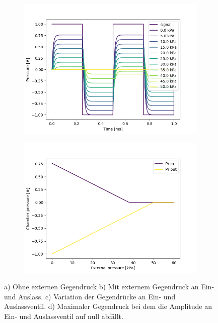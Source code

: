 \documentclass[fontsize=12pt, a4paper]{scrartcl}
\begin{document}
\begin{figure}[H]
\begin{subfigure}[H]{0.48\textwidth}
        \includegraphics[width=\textwidth, valign=t]{bilder/backpressure/backpressure_at_pr_in_and_pr_out.png}
    \end{subfigure}
    \begin{subfigure}[H]{0.48\textwidth}
        \includegraphics[width=\textwidth, valign=t]{bilder/backpressure/backpressure_result.png}
    \end{subfigure}
    \caption{a) Ohne externen Gegendruck b) Mit externem Gegendruck an Ein- und Auslass. c) Variation der Gegendrücke an Ein- und Auslassventil. d) Maximaler Gegendruck bei dem die Amplitude an Ein- und Auslassventil auf null abfällt.}
    \label{fig:gegendruck_all}
\end{figure}
\end{document}
